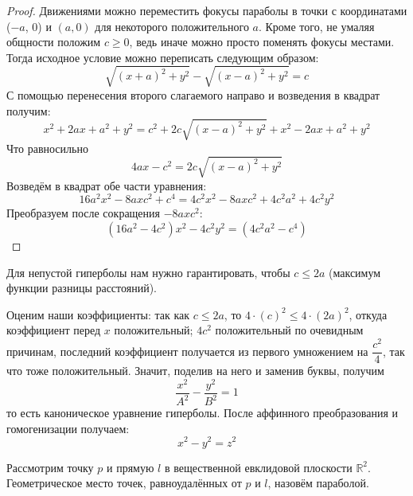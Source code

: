 \documentclass[11pt]{report}
\begin{document}
    \begin{proof}
    Движениями можно переместить фокусы параболы в точки с координатами ($-a$, $0$) и $(a, 0)$ для некоторого положительного $a$. Кроме того, не умаляя общности положим $c \geq 0$, ведь иначе можно просто поменять фокусы местами. Тогда исходное условие можно переписать следующим образом:
    \begin{equation*}
        \sqrt{(x + a)^2 + y^2} - \sqrt{(x - a)^2 + y^2} = c
    \end{equation*}
    С помощью перенесения второго слагаемого направо и возведения в квадрат получим:
    \begin{equation*}
        x^2 + 2ax + a^2 + y^2 = c^2 + 2c\sqrt{(x - a)^2 + y^2} + x^2 - 2ax + a^2 + y^2
    \end{equation*}
    Что равносильно
    \begin{equation*}
        4ax - c^2 = 2c\sqrt{(x - a)^2 + y^2}
    \end{equation*}
    Возведём в квадрат обе части уравнения:
    \begin{equation*}
        16a^2x^2 -8axc^2 + c^4 = 4c^2x^2 - 8axc^2 + 4c^2a^2 + 4c^2y^2
    \end{equation*}
    Преобразуем после сокращения $-8axc^2$:
    \begin{equation*}
        (16a^2 - 4c^2)x^2 - 4c^2y^2 = (4c^2a^2 - c^4)
    \end{equation*}
    \end{proof}

    \begin{remark}
        Для непустой гиперболы нам нужно гарантировать, чтобы $c \leq 2a$ (максимум функции разницы расстояний).
    \end{remark}

    \begin{remark}
    Оценим наши коэффициенты: так как $c \leq 2a$, то $4\cdot(c)^2 \leq 4\cdot(2a)^2$, откуда коэффициент перед $x$ положительный; $4c^2$ положительный по очевидным причинам, последний коэффициент получается из первого умножением на $\dfrac{c^2}{4}$, так что тоже положительный. Значит, поделив на него и заменив буквы, получим
    \begin{equation*}
        \dfrac{x^2}{A^2} - \dfrac{y^2}{B^2} = 1
    \end{equation*}
    то есть каноническое уравнение гиперболы. После аффинного преобразования и гомогенизации получаем:
    \begin{equation*}
        x^2 - y^2 = z^2
    \end{equation*}
    \end{remark}
    \begin{definition}
    Рассмотрим точку $p$ и прямую $l$ в вещественной евклидовой плоскости $\mathbb{R}^2$. Геометрическое место точек, равноудалённых от $p$ и $l$, назовём параболой.
    \end{definition}
\end{document}
